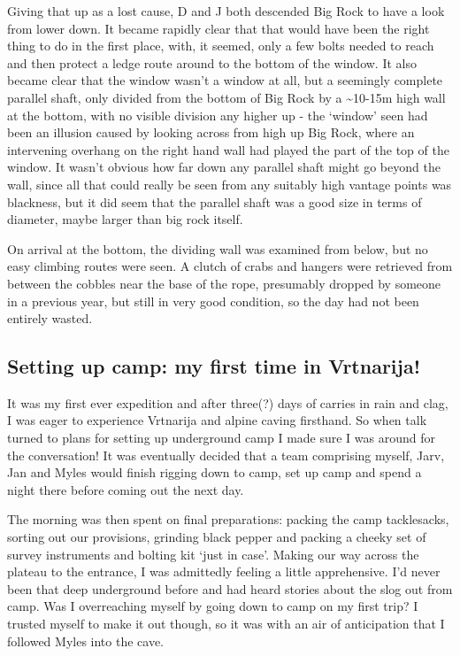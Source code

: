 Giving that up as a lost cause, D and J both descended Big Rock to have
a look from lower down. It became rapidly clear that that would have
been the right thing to do in the first place, with, it seemed, only a
few bolts needed to reach and then protect a ledge route around to the
bottom of the window. It also became clear that the window wasn't a
window at all, but a seemingly complete parallel shaft, only divided
from the bottom of Big Rock by a \textasciitilde{}10-15m high wall at
the bottom, with no visible division any higher up - the `window' seen
had been an illusion caused by looking across from high up Big Rock,
where an intervening overhang on the right hand wall had played the part
of the top of the window. It wasn't obvious how far down any parallel
shaft might go beyond the wall, since all that could really be seen from
any suitably high vantage points was blackness, but it did seem that the
parallel shaft was a good size in terms of diameter, maybe larger than
big rock itself.

On arrival at the bottom, the dividing wall was examined from below, but
no easy climbing routes were seen. A clutch of crabs and hangers were
retrieved from between the cobbles near the base of the rope, presumably
dropped by someone in a previous year, but still in very good condition,
so the day had not been entirely wasted.


\subsection{Setting up camp: my first time in Vrtnarija!}

It was my first ever expedition and after three(?) days of carries in
rain and clag, I was eager to experience Vrtnarija and alpine caving
firsthand. So when talk turned to plans for setting up underground camp
I made sure I was around for the conversation! It was eventually decided
that a team comprising myself, Jarv, Jan and Myles would finish rigging
down to camp, set up camp and spend a night there before coming out the
next day.

The morning was then spent on final preparations: packing the camp
tacklesacks, sorting out our provisions, grinding black pepper and
packing a cheeky set of survey instruments and bolting kit `just in
case'. Making our way across the plateau to the entrance, I was
admittedly feeling a little apprehensive. I'd never been that deep
underground before and had heard stories about the slog out from camp.
Was I overreaching myself by going down to camp on my first trip? I
trusted myself to make it out though, so it was with an air of
anticipation that I followed Myles into the cave.

